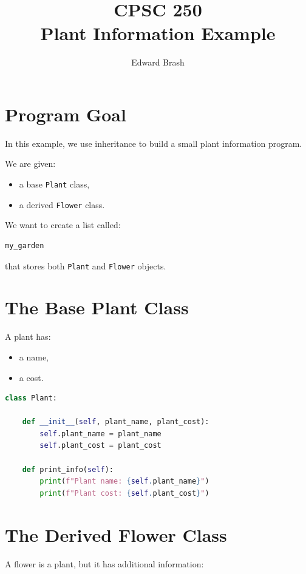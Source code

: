 \documentclass[11pt]{article}
\title{CPSC 250 \\ Plant Information Example}
\author{Edward Brash}
\date{}
\begin{document}
\maketitle

\section{Program Goal}

In this example, we use inheritance to build a small plant information program.

We are given:

\begin{itemize}
    \item a base \texttt{Plant} class,
    \item a derived \texttt{Flower} class.
\end{itemize}

We want to create a list called:

\begin{lstlisting}[language=Python]
my_garden
\end{lstlisting}

that stores both \texttt{Plant} and \texttt{Flower} objects.

\section{The Base Plant Class}

A plant has:

\begin{itemize}
    \item a name,
    \item a cost.
\end{itemize}

\begin{lstlisting}[language=Python]
class Plant:

    def __init__(self, plant_name, plant_cost):
        self.plant_name = plant_name
        self.plant_cost = plant_cost

    def print_info(self):
        print(f"Plant name: {self.plant_name}")
        print(f"Plant cost: {self.plant_cost}")
\end{lstlisting}

\section{The Derived Flower Class}

A flower is a plant, but it has additional information:
\end{document}
